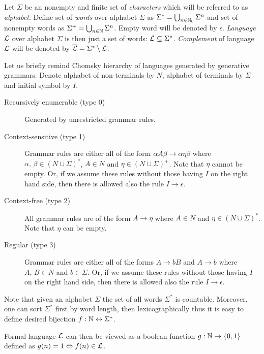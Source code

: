 		\begin{defn}
			Let $\Sigma$ be an nonempty and finite set of {\em characters} which will be referred to as {\em alphabet}. Define set of {\em words} over alphabet $\Sigma$ as $\Sigma^* = \bigcup_{n\in\N_0}\Sigma^n$ and set of nonempty words as $\Sigma^+ = \bigcup_{n\in\N}\Sigma^n$. Empty word will be denoted by $\epsilon$. {\em Language} ${\cal L}$ over alphabet $\Sigma$ is then just a set of words: ${\cal L} \subseteq \Sigma^*$. {\em Complement} of language $\cal L$ will be denoted by ${\cal\overline L} = \Sigma^* \setminus {\cal L}$.
		\end{defn}
		
		Let us briefly remind Chomsky hierarchy of languages generated by generative grammars. Denote alphabet of non-terminals by $N$, alphabet of terminals by $\Sigma$ and initial symbol by $I$.
		\begin{description}
			\item[Recursively enumerable (type 0)] Generated by unrestricted grammar rules.
			\item[Context-sensitive (type 1)] Grammar rules are either all of the form $\alpha A \beta \rightarrow \alpha \eta \beta$ where $\alpha,\,\beta\in (N\cup\Sigma)^*$, $A\in N$ and $\eta\in (N\cup\Sigma)^+$. Note that $\eta$ cannot be empty. Or, if we assume these rules without those having $I$ on the right hand side, then there is allowed also the rule $I\rightarrow \epsilon$.
			\item[Context-free (type 2)] All grammar rules are of the form $A\rightarrow\eta$ where $A\in N$ and $\eta\in (N\cup\Sigma)^*$. Note that $\eta$ can be empty.
			\item[Regular (type 3)] Grammar rules are either all of the forms $A\rightarrow bB$ and $A\rightarrow b$ where $A,\,B\in N$ and $b\in\Sigma$. Or, if we assume these rules without those having $I$ on the right hand side, then there is allowed also the rule $I\rightarrow \epsilon$.
		\end{description}
		
		\begin{remark}
			Note that given an alphabet $\Sigma$ the set of all words $\Sigma^*$ is countable. Moreover, one can sort $\Sigma^*$ first by word length, then lexicographically thus it is easy to define desired bijection $f: \N \leftrightarrow \Sigma^* $.
			
			Formal language ${\cal L}$ can then be viewed as a boolean function $g: \N \rightarrow \{0,1\}$ defined as
			$g(n) = 1 \iff f(n)\in {\cal L}$.
		\end{remark}
		
